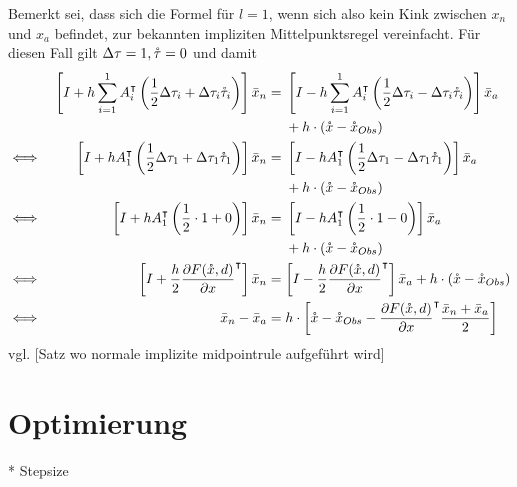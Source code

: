 Bemerkt sei, dass sich die Formel für $l=1$, wenn sich also kein Kink zwischen $x_n$ und $x_a$ befindet, zur bekannten impliziten Mittelpunktsregel vereinfacht. Für diesen Fall gilt $\Delta \tau =1,\mathring{\tau} = 0$ und damit
\begin{align*}
&& \left[I +h\sum_{i=1}^1 A_i^\intercal \left(\frac{1}{2} \Delta \tau_i +\Delta \tau_i \mathring{\tau}_i\right) \right]\bar{x}_n &=\begin{aligned}[t]
   & \left[I - h\sum_{i=1}^1 A_i^\intercal  \left(\frac{1}{2}\Delta \tau_i-\Delta \tau_i \mathring{\tau}_i\right)\right]\bar{x}_a  \\
	&+	h\cdot (\mathring{x} -\mathring{x}_{Obs}) 
       \end{aligned} \\
\iff &&  \left[I +h A_1^\intercal \left(\frac{1}{2} \Delta \tau_1 +\Delta \tau_1 \mathring{\tau}_1\right) \right]\bar{x}_n &= 
  \begin{aligned}[t]	
&\left[I - h A_1^\intercal  \left(\frac{1}{2}\Delta \tau_1-\Delta \tau_1 \mathring{\tau}_1\right)\right]\bar{x}_a  \\
&+h\cdot (\mathring{x} -\mathring{x}_{Obs})
  \end{aligned} \\
\iff &&  \left[I +h A_1^\intercal \left(\frac{1}{2} \cdot 1+0\right) \right]\bar{x}_n &= \begin{aligned}[t]
&\left[I - h A_1^\intercal  \left(\frac{1}{2} \cdot 1-0\right)\right]\bar{x}_a \\
&+h\cdot (\mathring{x} -\mathring{x}_{Obs})                                                                                  
\end{aligned}\\
\iff &&  \left[ I +\frac{h}{2} \frac{\partial F(\mathring{x} ,d)}{\partial x}^\intercal \right]\bar{x}_n &= \left[ I - \frac{h}{2}  \frac{\partial F(\mathring{x} ,d)}{\partial x}^\intercal  \right]\bar{x}_a  +h\cdot (\mathring{x} -\mathring{x}_{Obs})\\
\iff &&  \bar{x}_n - \bar{x}_a &=h\cdot \left[\mathring{x} -\mathring{x}_{Obs} - \frac{\partial F(\mathring{x} ,d)}{\partial x}^\intercal  \frac{\bar{x}_n + \bar{x}_a}{2}\right]\\
\end{align*}
vgl. [Satz wo normale implizite midpointrule aufgeführt wird]
 

 
\section{Optimierung}
*  Stepsize 
 
% 
